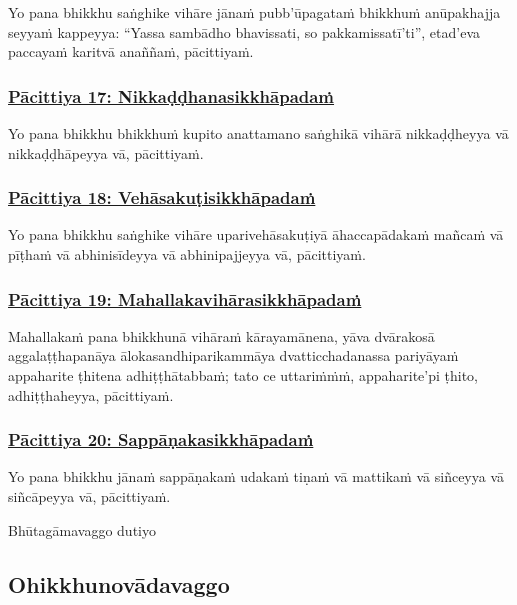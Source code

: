 Yo pana bhikkhu saṅghike vihāre jānaṁ pubb'ūpagataṁ bhikkhuṁ anūpakhajja seyyaṁ kappeyya: ``Yassa sambādho bhavissati, so pakkamissatī'ti'', etad'eva paccayaṁ karitvā anaññaṁ, pācittiyaṁ.

\subsubsection*{\hyperref[exp17]{Pācittiya 17: Nikkaḍḍhanasikkhāpadaṁ}}
\label{pac17}

Yo pana bhikkhu bhikkhuṁ kupito anattamano saṅghikā vihārā nikkaḍḍheyya vā nikkaḍḍhāpeyya vā, pācittiyaṁ.

\subsubsection*{\hyperref[exp18]{Pācittiya 18: Vehāsakuṭisikkhāpadaṁ}}
\label{pac18}

Yo pana bhikkhu saṅghike vihāre uparivehāsakuṭiyā āhaccapādakaṁ mañcaṁ vā pīṭhaṁ vā abhinisīdeyya vā abhinipajjeyya vā, pācittiyaṁ.

\subsubsection*{\hyperref[exp19]{Pācittiya 19: Mahallakavihārasikkhāpadaṁ}}
\label{pac19}

Mahallakaṁ pana bhikkhunā vihāraṁ kārayamānena, yāva dvārakosā aggalaṭṭhapanāya ālokasandhiparikammāya dvatticchadanassa pariyāyaṁ appaharite ṭhitena adhiṭṭhātabbaṁ; tato ce uttariṁṁṁ, appaharite'pi ṭhito, adhiṭṭhaheyya, pācittiyaṁ.

\subsubsection*{\hyperref[exp20]{Pācittiya 20: Sappāṇakasikkhāpadaṁ}}
\label{pac20}

Yo pana bhikkhu jānaṁ sappāṇakaṁ udakaṁ tiṇaṁ vā mattikaṁ vā siñceyya vā siñcāpeyya vā, pācittiyaṁ.

\begin{center}
  Bhūtagāmavaggo dutiyo
\end{center}

\subsection{Ohikkhunovādavaggo}
\vspace{0.2cm}

